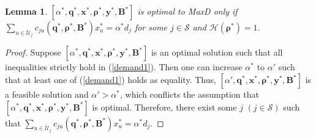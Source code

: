 \documentclass[10pt,journal,final,finalsubmission,twocolumn]{IEEEtran}
\newtheorem{lemma}[theorem]{Lemma}
\begin{document}
\begin{lemma}\label{property 1}
$[\alpha ^*, \boldsymbol{q}^*,\boldsymbol{x}^*,\boldsymbol{\rho}^*, \boldsymbol{y}^*, \boldsymbol{B}^*]$ is optimal to MaxD only if $\sum_{u\in \mathcal{U}_j} c_{ju}\left (\boldsymbol{q}^*,\boldsymbol{ \rho}^*, \boldsymbol{B}^*\right )x_u^*= \alpha^* d_j$ for some $j\in \mathcal{S}$ and $\mathcal{H}(\boldsymbol{\rho^*}) = 1$.
\end{lemma}
\begin{proof} 
Suppose $[\alpha ^*, \boldsymbol{q}^*,\boldsymbol{x}^*,\boldsymbol{\rho}^*, \boldsymbol{y}^*,\boldsymbol{B}^*]$ is an optimal solution such that all inequalities strictly hold in (\ref{demand1}). Then one can increase $\alpha^*$ to $\alpha'$ such that at least one of (\ref{demand1}) holds as equality.  Thus, $[\alpha', \boldsymbol{q}^*,\boldsymbol{x}^*,\boldsymbol{\rho}^*, \boldsymbol{y}^*,\boldsymbol{B}^*]$ is a feasible solution and $\alpha'>\alpha^*$, which conflicts the assumption that $[\alpha^*, \boldsymbol{q}^*,\boldsymbol{x}^*,\boldsymbol{\rho}^*, \boldsymbol{y}^*,\boldsymbol{B}^*]$ is optimal. Therefore, there exist some $j$ $(j\in \mathcal{S})$ such that $\sum_{u\in \mathcal{U}_j} c_{ju}\left (\boldsymbol{q}^*,\boldsymbol{ \rho}^*, \boldsymbol{B}^*\right )x_u^*= \alpha^* d_j$.


\end{proof}
\end{document}
